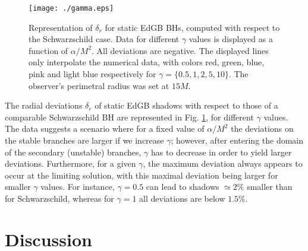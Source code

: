 \documentclass[12pt]{article}
\begin{document}
\begin{figure}[t]
\begin{center}
\texttt{[image: ./gamma.eps]}
\end{center}
\caption{\small  Representation of $\delta_r$ for static EdGB BHs, computed with respect to the Schwarzschild case. Data for different $\gamma$ values is displayed as a function of $\alpha/M^2$. All deviations are negative. {The displayed lines only interpolate the numerical data, with colors red, green, blue, pink and light blue respectively for $\gamma=\{0.5,1,2,5,10\}$. The observer's perimetral radius was set at $15M$.}
}
\label{fig-gamma}
\end{figure}

The radial deviations $\delta_r$ of static EdGB shadows with respect to those of a comparable Schwarzschild BH are represented in Fig. \ref{fig-gamma}, for different $\gamma$ values.
The data suggests a scenario 
where for a fixed value of $\alpha/M^2$ the deviations on the stable branches are larger if we increase $\gamma$; however, after entering the domain of the secondary (unstable) branches, $\gamma$ has to decrease in order to yield larger deviations. Furthermore, for a given $\gamma$, the maximum deviation always appears to occur at the limiting solution, with this maximal deviation being larger for smaller $\gamma$ values. For instance,
$\gamma=0.5$ can lead to shadows $\simeq 2\%$ smaller than for Schwarzschild, whereas for $\gamma=1$ all deviations are below $1.5\%$. 



\section{Discussion}
\label{section_discussion}
\end{document}
